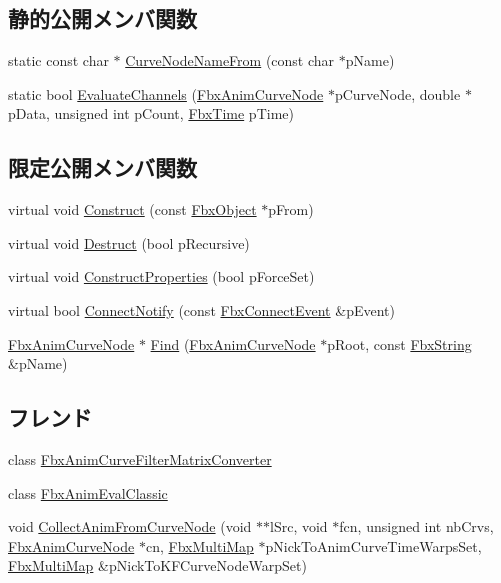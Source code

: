 \subsection*{静的公開メンバ関数}
\begin{DoxyCompactItemize}
\item 
static const char $\ast$ \hyperlink{class_fbx_anim_curve_node_ae75e53bb5e39cdefcd59e15e23924a13}{Curve\+Node\+Name\+From} (const char $\ast$p\+Name)
\item 
static bool \hyperlink{class_fbx_anim_curve_node_a114170d034199d8a40ccc037c495aa04}{Evaluate\+Channels} (\hyperlink{class_fbx_anim_curve_node}{Fbx\+Anim\+Curve\+Node} $\ast$p\+Curve\+Node, double $\ast$p\+Data, unsigned int p\+Count, \hyperlink{class_fbx_time}{Fbx\+Time} p\+Time)
\end{DoxyCompactItemize}
\subsection*{限定公開メンバ関数}
\begin{DoxyCompactItemize}
\item 
virtual void \hyperlink{class_fbx_anim_curve_node_a68463f3262085ccffef1d5a68fbd4823}{Construct} (const \hyperlink{class_fbx_object}{Fbx\+Object} $\ast$p\+From)
\item 
virtual void \hyperlink{class_fbx_anim_curve_node_aa5702533aa63185ec4549b73915476d7}{Destruct} (bool p\+Recursive)
\item 
virtual void \hyperlink{class_fbx_anim_curve_node_a979eca26d04013f0ef958173d34aef15}{Construct\+Properties} (bool p\+Force\+Set)
\item 
virtual bool \hyperlink{class_fbx_anim_curve_node_a0a3743b600796ab2b87dea299654b98c}{Connect\+Notify} (const \hyperlink{class_fbx_connect_event}{Fbx\+Connect\+Event} \&p\+Event)
\item 
\hyperlink{class_fbx_anim_curve_node}{Fbx\+Anim\+Curve\+Node} $\ast$ \hyperlink{class_fbx_anim_curve_node_aa60f953e94636bb23a94860f60cc63e1}{Find} (\hyperlink{class_fbx_anim_curve_node}{Fbx\+Anim\+Curve\+Node} $\ast$p\+Root, const \hyperlink{class_fbx_string}{Fbx\+String} \&p\+Name)
\end{DoxyCompactItemize}
\subsection*{フレンド}
\begin{DoxyCompactItemize}
\item 
class \hyperlink{class_fbx_anim_curve_node_a0e66be27522fe93db7ee48dbdb4420bb}{Fbx\+Anim\+Curve\+Filter\+Matrix\+Converter}
\item 
class \hyperlink{class_fbx_anim_curve_node_a1b769b6684b71dfe76f350fef1137cab}{Fbx\+Anim\+Eval\+Classic}
\item 
void \hyperlink{class_fbx_anim_curve_node_a54d20e7508453ca014d08b85da892621}{Collect\+Anim\+From\+Curve\+Node} (void $\ast$$\ast$l\+Src, void $\ast$fcn, unsigned int nb\+Crvs, \hyperlink{class_fbx_anim_curve_node}{Fbx\+Anim\+Curve\+Node} $\ast$cn, \hyperlink{class_fbx_multi_map}{Fbx\+Multi\+Map} $\ast$p\+Nick\+To\+Anim\+Curve\+Time\+Warps\+Set, \hyperlink{class_fbx_multi_map}{Fbx\+Multi\+Map} \&p\+Nick\+To\+K\+F\+Curve\+Node\+Warp\+Set)
\end{DoxyCompactItemize}
